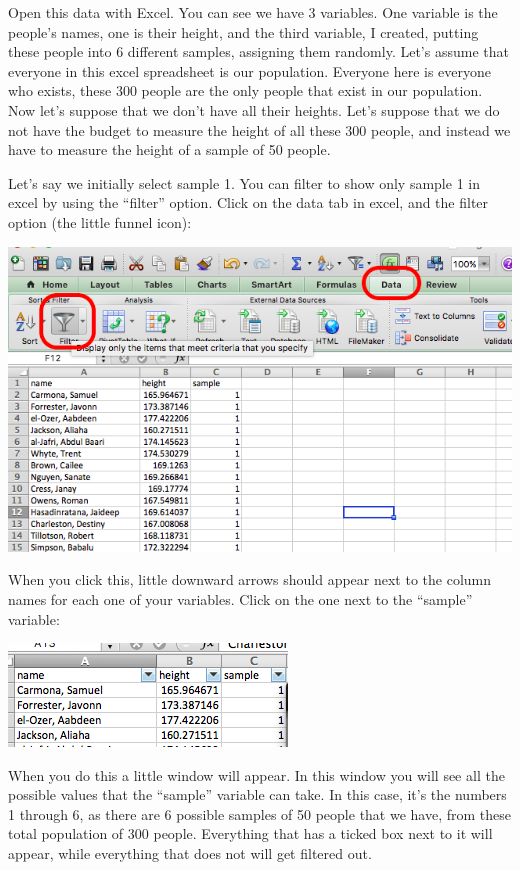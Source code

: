 \documentclass[
]{book}
\begin{document}
Open this data with Excel. You can see we have 3 variables. One variable is the people's names, one is their height, and the third variable, I created, putting these people into 6 different samples, assigning them randomly. Let's assume that everyone in this excel spreadsheet is our population. Everyone here is everyone who exists, these 300 people are the only people that exist in our population. Now let's suppose that we don't have all their heights. Let's suppose that we do not have the budget to measure the height of all these 300 people, and instead we have to measure the height of a sample of 50 people.

Let's say we initially select sample 1. You can filter to show only sample 1 in excel by using the ``filter'' option. Click on the data tab in excel, and the filter option (the little funnel icon):

\includegraphics{imgs/filter_data.png}

When you click this, little downward arrows should appear next to the column names for each one of your variables. Click on the one next to the ``sample'' variable:

\includegraphics{imgs/filter_arrows.png}

When you do this a little window will appear. In this window you will see all the possible values that the ``sample'' variable can take. In this case, it's the numbers 1 through 6, as there are 6 possible samples of 50 people that we have, from these total population of 300 people. Everything that has a ticked box next to it will appear, while everything that does not will get filtered out.
\end{document}
